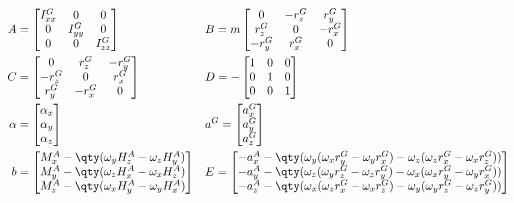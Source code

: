 \begin{align*}
  A &=
  \begin{bmatrix}
    I^G_{xx} & 0 & 0 \\
    0 & I^G_{yy} & 0 \\
    0 & 0 & I^G_{zz} \\
  \end{bmatrix}&
  &B = m
  \begin{bmatrix}
    0 & -r^G_z & r^G_y \\
    r^G_z & 0 & - r^G_x \\
    -r^G_y & r^G_x & 0
  \end{bmatrix}\\
  C &=
  \begin{bmatrix}
    0 & r^G_z & -r^G_y \\
    -r^G_z & 0 & r^G_x \\
    r^G_y & -r^G_x & 0
  \end{bmatrix}&
  &D = -
  \begin{bmatrix}
    1 & 0 & 0 \\
    0 & 1 & 0 \\
    0 & 0 & 1
  \end{bmatrix}\\
  \alpha &=
  \begin{bmatrix}
    \alpha_x \\
    \alpha_y \\
    \alpha_z \\
  \end{bmatrix}&
  &a^G =
  \begin{bmatrix}
    a^G_x \\
    a^G_y \\
    a^G_z
  \end{bmatrix}\\
  b &=
  \begin{bmatrix}
    M^A_x-\qty(\omega_y H^A_z-\omega_z H^A_y) \\
    M^A_y-\qty(\omega_z H^A_x-\omega_x H^A_z) \\
    M^A_z-\qty(\omega_x H^A_y-\omega_y H^A_x) \\
  \end{bmatrix}&
  &E =
  \begin{bmatrix}
    -a^A_x - \qty(\omega_y(\omega_x r^G_y - \omega_y r^G_x) - \omega_z(\omega_z r^G_x - \omega_x r^G_z))\\
    -a^A_y - \qty(\omega_z(\omega_y r^G_z - \omega_z r^G_y) - \omega_x(\omega_x r^G_y - \omega_y r^G_x))\\
    -a^A_z - \qty(\omega_x(\omega_z r^G_x - \omega_x r^G_z) - \omega_y(\omega_y r^G_z - \omega_z r^G_y))
  \end{bmatrix}
\end{align*}

